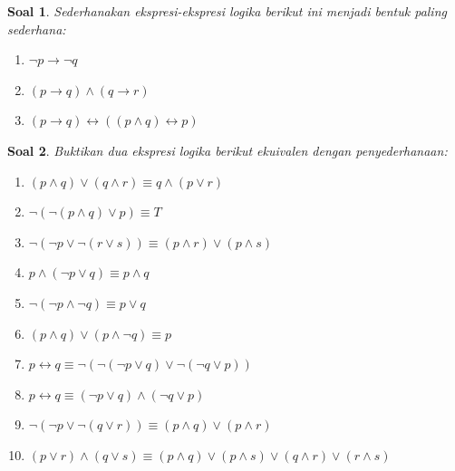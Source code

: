 \documentclass[12pt,a4paper]{article}
\theoremstyle{soaljarak}
\newtheorem{soal}{Soal}
\begin{document}
\begin{soal}
  Sederhanakan ekspresi-ekspresi logika berikut ini menjadi bentuk paling sederhana:
  \begin{enumerate}
    \item $\neg p \rightarrow \neg q$
    \item $(p \rightarrow q) \wedge (q \rightarrow r)$
    \item $(p \rightarrow q)\leftrightarrow ((p \wedge q) \leftrightarrow p)$
  \end{enumerate}
\end{soal}

\begin{soal}
  Buktikan dua ekspresi logika berikut ekuivalen dengan penyederhanaan:
  \begin{enumerate}
    \item $(p \wedge q)\vee (q \wedge r) \equiv q \wedge (p \vee r)$
    \item $\neg(\neg(p \wedge q)\vee p) \equiv T$
    \item $\neg(\neg p \vee \neg(r \vee s))\equiv (p \wedge r)\vee (p \wedge s)$
    \item $p \wedge (\neg p \vee q)\equiv p \wedge q$
    \item $\neg(\neg p \wedge \neg q)\equiv p \vee q$
    \item $(p \wedge q)\vee(p \wedge \neg q)\equiv p$
    \item $p \leftrightarrow q \equiv \neg(\neg(\neg p \vee q)\vee \neg(\neg q \vee p))$
    \item $p \leftrightarrow q \equiv (\neg p \vee q) \wedge (\neg q \vee p)$
    \item $\neg(\neg p \vee \neg(q \vee r))\equiv (p \wedge q) \vee (p \wedge r)$
    \item $(p \vee r)\wedge(q \vee s)\equiv (p \wedge q)\vee(p \wedge s)\vee(q \wedge r)\vee(r \wedge s)$
  \end{enumerate}
\end{soal}
\end{document}
